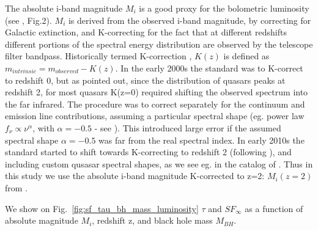 \documentclass[twocolumn]{aastex62}
\begin{document}
The absolute i-band magnitude $M_{i}$ is a good proxy for the bolometric luminosity (see \citealt{shen2008}, Fig.2). $M_{i}$ is derived from the observed i-band magnitude, by correcting for Galactic extinction, and K-correcting for the fact that at different redshifts different portions of the spectral energy distribution are observed by the telescope filter bandpass. Historically termed K-correction \citep{oke1968}, $K(z)$ is defined as $m_{intrinsic} = m_{observed} - K(z)$. In the early 2000s the standard was to K-correct to redshift 0, but as \citep{richards2006a} pointed out, since the distribution of quasars peaks at redshift 2, for most quasars K(z=0) required shifting the observed spectrum into the far infrared. The procedure was to correct separately for the continuum and emission line contributions, assuming a particular spectral shape (eg. power law  $f_{\nu} \propto \nu^{\alpha}$, with $\alpha=-0.5$ - see \citealt{schneider2010, vandenberk2001, richards2006a}). This introduced large error if the assumed spectral shape $\alpha=-0.5$ was far from the real spectral index. In early 2010s the standard started to shift towards K-correcting to redshift 2 (following  \citealt{richards2006a, wisotzki2000, blanton2003}), and including custom qusasar spectral shapes, as we see eg. in the catalog of \citep{shen2011}. Thus in this study we use  the absolute i-band magnitude K-corrected to z=2: $M_{i}(z=2)$ from \citep{shen2011}. 





\begin{figure*}
\caption{Distribution of quasars as a function of  redshift, observed i-band magnitude, absolute i-band magnitude (K-corrected to z=2), and virial black hole mass. All quantities from \citep{shen2011}. }
\label{fig:quasar_properties}
\end{figure*} 


We show on  Fig.~\ref{fig:sf_tau_bh_mass_luminosity} $\tau$ and $SF_{\infty}$ as a function of absolute magnitude $M_{i}$, redshift z, and black hole mass $M_{BH}$. 



\begin{figure*}
\caption{Long-term variability ($SF_{\infty}$), and characteristic timescale ($\tau$), as a function of absolute i-band magnitude (K-corrected to redshift 2, proxy for bolometric luminosity), virial black hole mass, and redshift. }
\label{fig:sf_tau_bh_mass_luminosity}
\end{figure*} 
\end{document}
